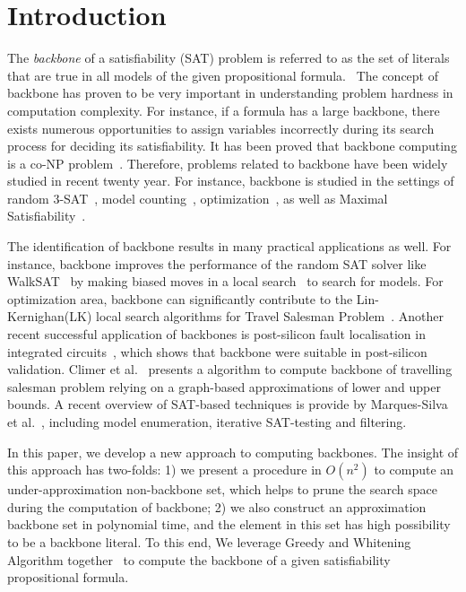 
\section{Introduction}

The \textit{backbone} of a satisfiability (SAT) problem is referred to as the set of literals that are true in all models of the given propositional formula.~\cite{MJML2010} The concept of backbone has proven to be very important in understanding problem hardness in computation complexity. For instance, if a formula has a large backbone, there exists numerous opportunities to assign variables incorrectly during its search process for deciding its satisfiability.  It has been proved that backbone computing is a co-NP problem~\cite{Jan10}. Therefore, problems related to backbone have been widely studied in recent twenty year. For instance, backbone is studied in the settings of random 3-SAT~\cite{DOG2001}, model counting~\cite{IMM2016}, optimization~\cite{CJG2001,KPS2005,WTS2001}, as well as Maximal Satisfiability~\cite{MM2005}.

The identification of backbone results in many practical applications as well. For instance, backbone improves the performance of the random SAT solver like  WalkSAT~\cite{SBK1993} by making biased moves in a local search~\cite{ZWR2003,MAR2007} to search for models. For optimization area,  backbone can significantly contribute to the Lin-Kernighan(LK) local search algorithms for Travel Salesman Problem~\cite{ZWL2005}. Another recent successful application of backbones is post-silicon fault localisation in integrated circuits~\cite{Z11}, which shows that backbone were suitable in post-silicon validation.
Climer et al.~\cite{CZW2002} presents a algorithm to compute backbone of travelling salesman problem relying on a graph-based approximations of lower and upper bounds.
A recent overview of SAT-based techniques is provide by Marques-Silva et al.~\cite{MJML2010}, including model enumeration, iterative SAT-testing and filtering.

In this paper, we develop a new approach \tool to computing  backbones. The insight of this approach has two-folds: 1) we present a procedure in $O(n^2)$ to compute an under-approximation non-backbone set, which helps to prune the search space during the computation of backbone; 2) we also construct an approximation backbone set in polynomial time, and the element in this set has high possibility to be a backbone literal. To this end, We leverage Greedy and Whitening Algorithm together~\cite{Par03} to compute the backbone of a given satisfiability propositional formula.

